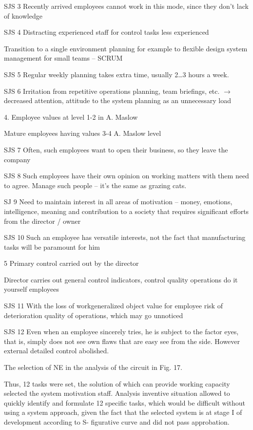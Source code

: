 \documentclass[11pt,a4paper]{book}
\begin{document}
SJS 3 Recently arrived employees cannot work in this mode, since they don’t
lack of knowledge

SJS 4 Distracting experienced staff for control tasks less experienced

Transition to a single environment planning for example to flexible design
system management for small teams -- SCRUM

SJS 5 Regular weekly planning takes extra time, usually 2\ldots3 hours a week.

SJS 6 Irritation from repetitive operations planning, team briefings, etc.
$\to$ decreased attention, attitude to the system planning as an unnecessary
load

4.  Employee values at level 1-2 in A.  Maslow

Mature employees having values 3-4 A. Maslow level

SJS 7 Often, such employees want to open their business, so they leave the
company

SJS 8 Such employees have their own opinion on working matters with them need
to agree. Manage such people -- it’s the same as grazing cats.

SJ 9 Need to maintain interest in all areas of motivation -- money, emotions,
intelligence, meaning and contribution to a society that requires significant
efforts from the director / owner

SJS 10 Such an employee has versatile interests, not the fact that
manufacturing tasks will be paramount for him

5 Primary control carried out by the director

Director carries out general control indicators, control quality operations do
it yourself employees

SJS 11 With the loss of workgeneralized object value for employee risk of deterioration
quality of operations, which may go unnoticed

SJS 12 Even when an employee sincerely tries, he is subject to the factor
eyes, that is, simply does not see own flaws that are easy see from the side.
However external detailed control abolished.


The selection of NE in the analysis of the circuit in Fig. 17.

Thus, 12 tasks were set, the solution of which can provide working capacity
selected the system motivation staff.  Analysis inventive situation allowed to
quickly identify and formulate 12 specific tasks, which would be difficult
without using a system approach, given the fact that the selected system is at
stage I of development according to S- figurative curve and did not pass
approbation.
\end{document}
